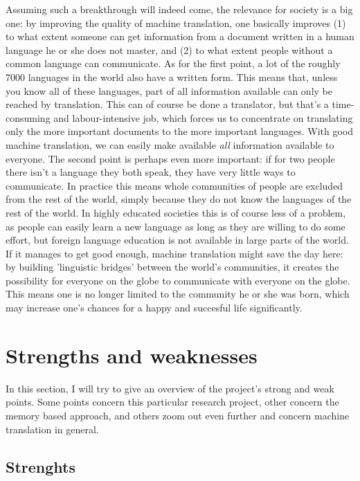 \documentclass[12pt]{article}
\begin{document}
Assuming such a breakthrough will indeed come, the relevance for society is a big one: by improving the quality of machine translation, one basically improves (1) to what extent someone can get information from a document written in a human language he or she does not master, and (2) to what extent people without a common language can communicate. As for the first point, a lot of the roughly 7000 languages in the world also have a written form. This means that, unless you know all of these languages, part of all information available can only be reached by translation. This can of course be done a translator, but that's a time-consuming and labour-intensive job, which forces us to concentrate on translating only the more important documents to the more important languages. With good machine translation, we can easily make available \emph{all} information available to everyone. The second point is perhaps even more important: if for two people there isn't a language they both speak, they have very little ways to communicate. In practice this means whole communities of people are excluded from the rest of the world, simply because they do not know the languages of the rest of the world. In highly educated societies this is of course less of a problem, as people can easily learn a new language as long as they are willing to do some effort, but foreign language education is not available in large parts of the world. If it manages to get good enough, machine translation might save the day here: by building 'linguistic bridges' between the world's communities, it creates the possibility for everyone on the globe to communicate with everyone on the globe. This means one is no longer limited to the community he or she was born, which may increase one's chances for a happy and succesful life significantly.






\section{Strengths and weaknesses}

In this section, I will try to give an overview of the project's strong and weak points. Some points concern this particular research project, other concern the memory based approach, and others zoom out even further and concern machine translation in general.

\subsection{Strenghts}
\end{document}
